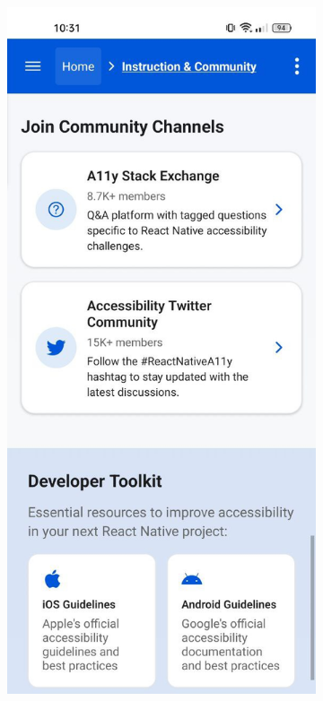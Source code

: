 \begin{figure}[ht]
    \centering
    \begin{subfigure}[b]{0.48\textwidth}
        \centering
        \includegraphics[width=\linewidth, alt={Third part of the Instruction and community screen}]{img/instruction3.jpg}

\end{subfigure}
\end{figure}
